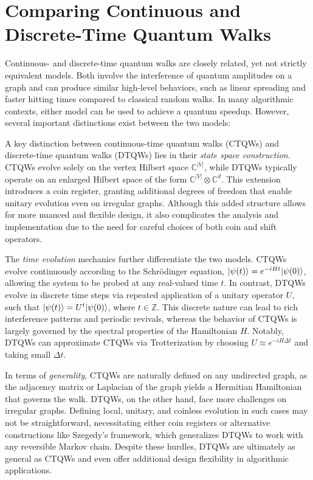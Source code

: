 \documentclass[12pt]{report}
\begin{document}
\section{Comparing Continuous and Discrete-Time Quantum Walks}



Continuous- and discrete-time quantum walks are closely related, yet not strictly equivalent models. Both involve the interference of quantum amplitudes on a graph and can produce similar high-level behaviors, such as linear spreading and faster hitting times compared to classical random walks. In many algorithmic contexts, either model can be used to achieve a quantum speedup. However, several important distinctions exist between the two models:


A key distinction between continuous-time quantum walks (CTQWs) and discrete-time quantum walks (DTQWs) lies in their \textit{state space construction}. CTQWs evolve solely on the vertex Hilbert space $\mathbb{C}^{|V|}$, while DTQWs typically operate on an enlarged Hilbert space of the form $\mathbb{C}^{|V|} \otimes \mathbb{C}^d$. This extension introduces a coin register, granting additional degrees of freedom that enable unitary evolution even on irregular graphs. Although this added structure allows for more nuanced and flexible design, it also complicates the analysis and implementation due to the need for careful choices of both coin and shift operators.

The \textit{time evolution} mechanics further differentiate the two models. CTQWs evolve continuously according to the Schrödinger equation, $\lvert\psi(t)\rangle = e^{-iHt} \lvert\psi(0)\rangle$, allowing the system to be probed at any real-valued time $t$. In contrast, DTQWs evolve in discrete time steps via repeated application of a unitary operator $U$, such that $\lvert\psi(t)\rangle = U^t \lvert\psi(0)\rangle$, where $t \in \mathbb{Z}$. This discrete nature can lead to rich interference patterns and periodic revivals, whereas the behavior of CTQWs is largely governed by the spectral properties of the Hamiltonian $H$. Notably, DTQWs can approximate CTQWs via Trotterization by choosing $U \approx e^{-iH \Delta t}$ and taking small $\Delta t$.

In terms of \textit{generality}, CTQWs are naturally defined on any undirected graph, as the adjacency matrix or Laplacian of the graph yields a Hermitian Hamiltonian that governs the walk. DTQWs, on the other hand, face more challenges on irregular graphs. Defining local, unitary, and coinless evolution in such cases may not be straightforward, necessitating either coin registers or alternative constructions like Szegedy’s framework, which generalizes DTQWs to work with any reversible Markov chain. Despite these hurdles, DTQWs are ultimately as general as CTQWs and even offer additional design flexibility in algorithmic applications.
\end{document}
